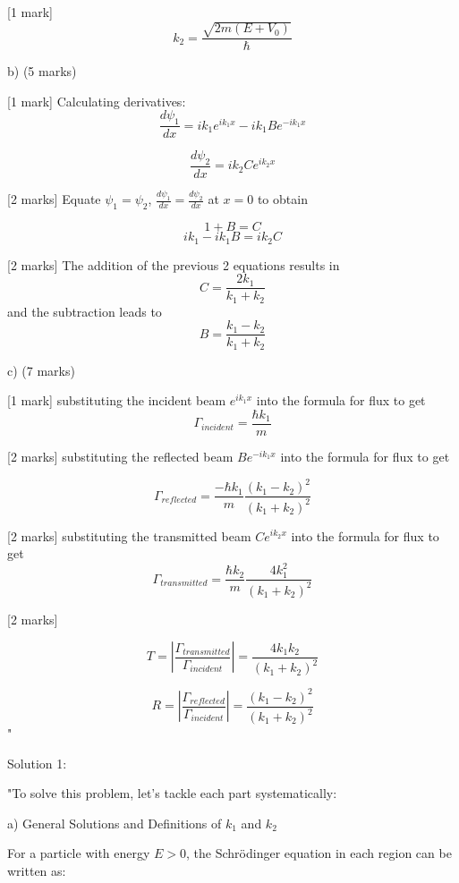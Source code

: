 [1 mark] \[k_{2} = \frac{\sqrt{2m(E+V_0)}}{\hbar} \]

b) (5 marks)

[1 mark] Calculating derivatives:
\[ \frac{d\psi_1}{dx} = ik_{1}e^{ik_{1}x} - ik_{1}Be^{-ik_{1}x} \]

\[ \frac{d\psi_2}{dx} = ik_{2}Ce^{ik_{2}x} \]

[2 marks] Equate \( \psi_{1} = \psi_{2} \), \( \frac{d\psi_1}{dx} = \frac{d\psi_2}{dx} \) at \(x = 0\) to obtain

\[1 + B = C\]
\[ik_{1} - ik_{1}B = ik_{2}C\]

[2 marks] The addition of the previous 2 equations results in \[ C = \frac{2k_{1}}{k_{1}+k_{2}} \] and the subtraction leads to  \[ B = \frac{k_{1}-k_{2}}{k_{1}+k_{2}} \]

c) (7 marks)

[1 mark] substituting the incident beam \( e^{ik_{1}x} \) into the formula for flux to get \[\Gamma_{incident} = \frac{\hbar k_{1}}{m} \]

[2 marks] substituting the reflected beam \( Be^{-ik_{1}x} \) into the formula for flux to get 

\[ 
\Gamma_{reflected} = \frac{-\hbar k_{1}}{m}\frac{\left(k_{1} - k_{2} \right)^{2}}{ \left(k_{1} + k_{2} \right)^{2}} 
\]

[2 marks] substituting the transmitted beam \( Ce^{ik_{2}x} \) into the formula for flux to get \[\Gamma_{transmitted} = \frac{\hbar k_{2}}{m} \frac{4k_{1}^{2}}{ \left(k_{1} + k_{2} \right)^{2}} \]

[2 marks]

\[ T = \left|\frac{\Gamma_{transmitted}}{\Gamma_{incident}} \right| = \frac{4k_{1}k_{2}}{(k_{1}+k_{2})^{2}} \]

\[R = \left|\frac{\Gamma_{reflected}}{\Gamma_{incident}} \right| = \frac{(k_{1}-k_{2})^{2}}{(k_{1}+k_{2})^{2}} \]
"

Solution 1:

"To solve this problem, let's tackle each part systematically:

a) General Solutions and Definitions of \(k_1\) and \(k_2\)

For a particle with energy \(E > 0\), the Schrödinger equation in each region can be written as:


